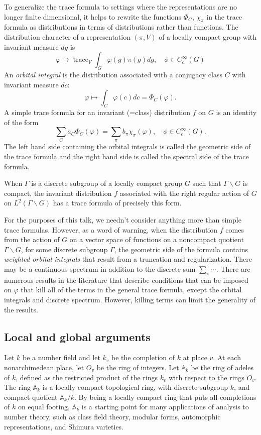 \documentclass[brochure,english,12pt]{bourbaki}
\def\op#1{{\operatorname{#1}}}
\newcommand{\ring}[1]{\mathbb{#1}}
\def\AD{\ring{A}}
\begin{document}
To generalize the trace formula to settings where the representations are no longer
finite dimensional, it helps to rewrite the functions $\Phi_C$, $\chi_\pi$
in the trace formula as distributions in terms of distributions rather than functions.
The distribution character of a representation $(\pi,V)$ of a locally compact group with
invariant measure $dg$ is 
\[\varphi \mapsto \op{trace}_V \int_G \varphi(g)\pi(g) dg, \quad \phi\in C_c^\infty(G)
\]
An {\it orbital integral} is the distribution associated with a conjugacy class $C$ with
invariant measure $dc$:
\[
\varphi \mapsto\int_C \varphi(c) dc  = \Phi_C(\varphi).
\]
A simple trace formula for an invariant (=class) distribution $f$ on $G$ is an identity of the
form 
\[
 \sum_C a_C \Phi_C(\varphi) = \sum_{\pi} b_\pi \chi_\pi(\varphi),\quad  \phi\in C_c^\infty(G).
\]
The left hand side containing the orbital integrals is called the
geometric side of the trace formula and the right hand side is called
the spectral side of the trace formula.

When $\Gamma$ is a discrete subgroup of a locally compact group $G$
such that $\Gamma\backslash G$ is compact, the invariant distribution
$f$ associated with the right regular action of $G$ on
$L^2(\Gamma\backslash G)$ has a trace formula of precisely this form.

For the purposes of this talk, we needn't consider anything more than
simple trace formulas.  However, as a word of warning, when the
distribution $f$ comes from the action of $G$ on a vector space of
functions on a noncompact quotient $\Gamma\backslash G$, for some
discrete subgroup $\Gamma$, the geometric side of the formula contains
{\it weighted orbital integrals} that result from a truncation and
regularization.  There may be a continuous spectrum in addition to the
discrete sum $\sum_\pi \cdots$.  There are numerous results in the
literature that describe conditions that can be imposed on $\varphi$
that kill all of the terms in the general trace formula, except the
orbital integrals and discrete spectrum.  However, killing terms can
limit the generality of the results.


\subsection{Local and global arguments}

Let $k$ be a number field and let $k_v$ be the completion of $k$ at
place $v$.  At each nonarchimedean place, let $O_v$ be the ring of
integers.  Let $\AD_k$ be the ring of adeles of $k$, defined as the
restricted product of the rings $k_v$ with respect to the rings $O_v$.
The ring $\AD_k$ is a locally compact topological ring, with discrete
subgroup $k$, and compact quotient $\AD_k/k$.  By being a locally
compact ring that puts all completions of $k$ on equal footing, $\AD_k$
is a starting point for many applications of analysis to number
theory, such as class field theory, modular forms, automorphic
representations, and Shimura varieties.
\end{document}

